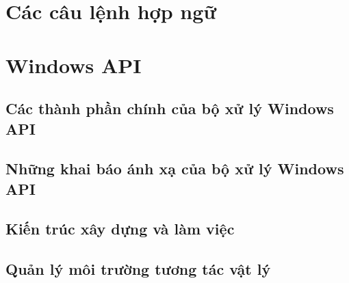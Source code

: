 \section{Các câu lệnh hợp ngữ}

\section{Windows API}

\subsection{Các thành phần chính của bộ xử lý Windows API}

\subsection{Những khai báo ánh xạ của bộ xử lý Windows API}

\subsection{Kiến trúc xây dựng và làm việc}

\subsection{Quản lý môi trường tương tác vật lý}